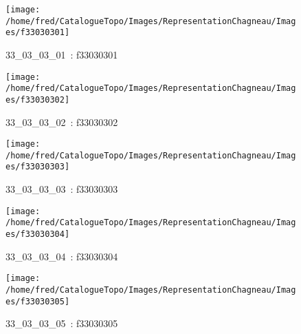 \documentclass[12pt,titlepage]{book}
\begin{document}
\begin{figure}[h!]
  \hfill         %
  \begin{minipage}[t]{3cm}
    \begin{center}
      \texttt{[image: /home/fred/CatalogueTopo/Images/RepresentationChagneau/Images/f33030301]}
      \caption[~33\_03\_03\_01]{\small{33\_03\_03\_01~:} \tiny{f33030301}}\label{f33030301}
    \end{center}
  \end{minipage}
  \begin{minipage}[t]{3cm}
    \begin{center}
      \texttt{[image: /home/fred/CatalogueTopo/Images/RepresentationChagneau/Images/f33030302]}
      \caption[~33\_03\_03\_02]{\small{33\_03\_03\_02~:} \tiny{f33030302}}\label{f33030302}
    \end{center}
  \end{minipage}
  \begin{minipage}[t]{3cm}
    \begin{center}
      \texttt{[image: /home/fred/CatalogueTopo/Images/RepresentationChagneau/Images/f33030303]}
      \caption[~33\_03\_03\_03]{\small{33\_03\_03\_03~:} \tiny{f33030303}}\label{f33030303}
    \end{center}
  \end{minipage}
  \begin{minipage}[t]{3cm}
    \begin{center}
      \texttt{[image: /home/fred/CatalogueTopo/Images/RepresentationChagneau/Images/f33030304]}
      \caption[~33\_03\_03\_04]{\small{33\_03\_03\_04~:} \tiny{f33030304}}\label{f33030304}
    \end{center}
  \end{minipage}
  \begin{minipage}[t]{3cm}
    \begin{center}
      \texttt{[image: /home/fred/CatalogueTopo/Images/RepresentationChagneau/Images/f33030305]}
      \caption[~33\_03\_03\_05]{\small{33\_03\_03\_05~:} \tiny{f33030305}}\label{f33030305}
    \end{center}
  \end{minipage}
\end{figure}
\end{document}
